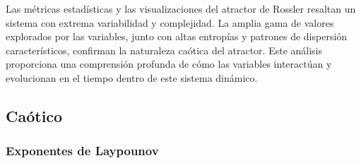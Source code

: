 \documentclass[11pt]{article}
\begin{document}
Las métricas estadísticas y las visualizaciones del atractor de Rossler
resaltan un sistema con extrema variabilidad y complejidad. La amplia
gama de valores explorados por las variables, junto con altas entropías
y patrones de dispersión característicos, confirman la naturaleza
caótica del atractor. Este análisis proporciona una comprensión profunda
de cómo las variables interactúan y evolucionan en el tiempo dentro de
este sistema dinámico.

    \hypertarget{cauxf3tico}{%
\subsection{Caótico}\label{cauxf3tico}}

    \hypertarget{exponentes-de-laypounov}{%
\subsubsection{Exponentes de Laypounov}\label{exponentes-de-laypounov}}
\end{document}
